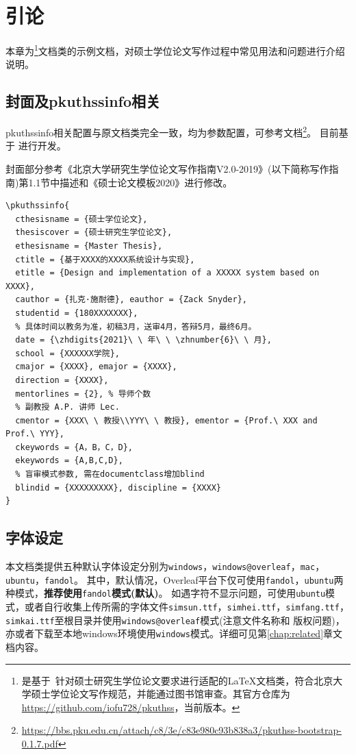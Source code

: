 \chapter{引论}
\label{chap:introduction}

本章为\iofupkuthss{}\footnote{\iofupkuthss{} 是基于\pkuthss{}~\cite{casper2011pkuthss}针对硕士研究生学位论文要求进行适配的\LaTeX{}文档类，符合北京大学硕士学位论文写作规范，并能通过图书馆审查。其官方仓库为\url{https://github.com/iofu728/pkuthss}，当前版本\iofuversion。}文档类的示例文档，对硕士学位论文写作过程中常见用法和问题进行介绍说明。

\section{封面及pkuthssinfo相关}
\label{sec:cover-pkuthssinfo}

pkuthssinfo相关配置与\pkuthss{}原文档类完全一致，均为参数配置，可参考\pkuthss{}文档\footnote{\url{https://bbs.pku.edu.cn/attach/c8/3e/c83e980c93b838a3/pkuthss-bootstrap-0.1.7.pdf}}。
目前\iofupkuthss{}基于\pkuthss{} \iofubaseversion{}进行开发。

封面部分参考《北京大学研究生学位论文写作指南V2.0-2019》(以下简称写作指南)第1.1节中描述和《硕士论文模板2020》进行修改。

\begin{Verbatim}
\pkuthssinfo{
  cthesisname = {硕士学位论文},
  thesiscover = {硕士研究生学位论文},
  ethesisname = {Master Thesis},
  ctitle = {基于XXXX的XXXX系统设计与实现},
  etitle = {Design and implementation of a XXXXX system based on XXXX},
  cauthor = {扎克·施耐德}, eauthor = {Zack Snyder},
  studentid = {180XXXXXXX},
  % 具体时间以教务为准，初稿3月，送审4月，答辩5月，最终6月。
  date = {\zhdigits{2021}\ \ 年\ \ \zhnumber{6}\ \ 月},
  school = {XXXXXX学院},
  cmajor = {XXXX}, emajor = {XXXX},
  direction = {XXXX},
  mentorlines = {2}, % 导师个数
  % 副教授 A.P. 讲师 Lec.
  cmentor = {XXX\ \ 教授\\YYY\ \ 教授}, ementor = {Prof.\ XXX and Prof.\ YYY},
  ckeywords = {A，B，C，D},
  ekeywords = {A,B,C,D},
  % 盲审模式参数, 需在documentclass增加blind
  blindid = {XXXXXXXXX}, discipline = {XXXX}
}
\end{Verbatim}

\section{字体设定}
\label{sec:fontset}

本文档类提供五种默认字体设定分别为\verb|windows|，\verb|windows@overleaf|，\verb|mac|，\verb|ubuntu|，\verb|fandol|。
其中，默认情况，Overleaf平台下仅可使用\verb|fandol|，\verb|ubuntu|两种模式，\textbf{推荐使用}\verb|fandol|\textbf{模式(默认)}。
如遇字符不显示问题，可使用\verb|ubuntu|模式，或者自行收集上传所需的字体文件\verb|simsun.ttf|，\verb|simhei.ttf|，\verb|simfang.ttf|，\verb|simkai.ttf|至根目录并使用\verb|windows@overleaf|模式(注意文件名称和 版权问题)，亦或者下载至本地windows环境使用\verb|windows|模式。详细可见第\ref{chap:related}章文档内容。

